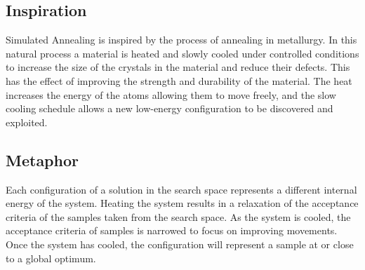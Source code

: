 \subsection{Inspiration}
Simulated Annealing is inspired by the process of annealing in metallurgy. In this natural process a material is heated and slowly cooled under controlled conditions to increase the size of the crystals in the material and reduce their defects. This has the effect of improving the strength and durability of the material. The heat increases the energy of the atoms allowing them to move freely, and the slow cooling schedule allows a new low-energy configuration to be discovered and exploited.

\subsection{Metaphor}
Each configuration of a solution in the search space represents a different internal energy of the system. Heating the system results in a relaxation of the acceptance criteria of the samples taken from the search space. As the system is cooled, the acceptance criteria of samples is narrowed to focus on improving movements. Once the system has cooled, the configuration will represent a sample at or close to a global optimum. 

